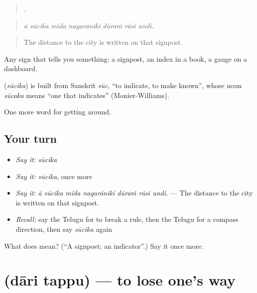 \begin{quote}
      .
\end{quote}

\begin{quote}
\emph{ā sūcika mīda nagarāniki dūraṁ rāsi undi.}
\end{quote}

\begin{quote}
The distance to the city is written on that signpost.
\end{quote}

Any sign that tells you something: a signpost, an index in a book, a gauge on a dashboard.

\begin{cousinweb}
\textbf{} (\emph{sūcika}) is built from Sanskrit \emph{sūc}, \textquotedblleft{}to indicate, to make known\textquotedblright{}, whose noun \emph{sūcaka} means \textquotedblleft{}one that indicates\textquotedblright{} (Monier-Williams).
\end{cousinweb}

\begin{grammarlens}[title={What you've built}]
One more word for getting around.
\end{grammarlens}

\subsection*{Your turn}
\begin{itemize}
\raggedright
  \item \emph{Say it:} \emph{sūcika}
  \item \emph{Say it:} \emph{sūcika}, once more
  \item \emph{Say it:} \emph{ā sūcika mīda nagarāniki dūraṁ rāsi undi.} — The distance to the city is written on that signpost.
  \item \emph{Recall:} say the Telugu for to break a rule, then the Telugu for a compass direction, then say \emph{sūcika} again
\end{itemize}

\begin{tcolorbox}[breakable,colback=teal!4,colframe=teal!35!black,title={Before you move on}]
What does  mean? (\textquotedblleft{}A signpost; an indicator\textquotedblright{}.) Say it once more.
\end{tcolorbox}
\section[\texorpdfstring{\te{దారి} \te{తప్పు} (dāri tappu)}{దారి తప్పు (dāri tappu)}]{  (dāri tappu) — to lose one's way}

